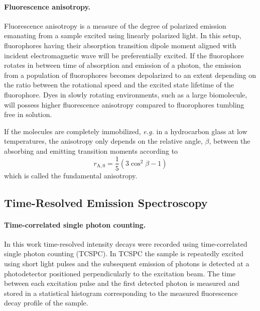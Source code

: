  \paragraph{Fluorescence anisotropy.} Fluorescence anisotropy is a measure of the degree of polarized emission emanating from a sample excited using linearly polarized light. In this setup, fluorophores having their absorption transition dipole moment aligned with incident electromagnetic wave will be preferentially excited. If the fluorophore rotates in between time of absorption and emission of a photon, the emission from a population of fluorophores becomes depolarized to an extent depending on the ratio between the rotational speed and the excited state lifetime of the fluorophore. Dyes in slowly rotating environments, such as a large biomolecule, will possess higher fluorescence anisotropy compared to fluorophores tumbling free in solution.

 If the molecules are completely immobilized, \emph{e.g.} in a hydrocarbon glass at low temperatures, the anisotropy only depends on the relative angle, $\beta$, between the absorbing and emitting transition moments according to
\begin{equation}
 r_{\mathrm{A},0} = \frac{1}{5}\left(3\cos^2\beta - 1\right)
 \label{eq:Anisotropi2}
\end{equation}
 which is called the fundamental anisotropy.

\subsection{Time-Resolved Emission Spectroscopy}

 \paragraph{Time-correlated single photon counting.} In this work time-resolved intensity decays were recorded using time-correlated single photon counting (TCSPC). In TCSPC the sample is repeatedly excited using short light pulses and the subsequent emission of photons is detected at a photodetector positioned perpendicularly to the excitation beam. The time between each excitation pulse and the first detected photon is measured and stored in a statistical histogram corresponding to the measured fluorescence decay profile of the sample.\cite{Lak}

